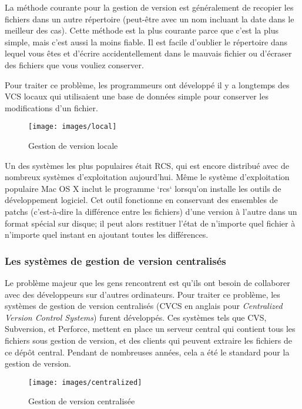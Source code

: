 La méthode courante pour la gestion de version est généralement de recopier les fichiers dans un autre répertoire (peut-être avec un nom incluant la date dans le meilleur des cas).
Cette méthode est la plus courante parce que c'est la plus simple, mais c'est aussi la moins fiable.
Il est facile d'oublier le répertoire dans lequel vous êtes et d'écrire accidentellement dans le mauvais fichier ou d'écraser des fichiers que vous vouliez conserver.

Pour traiter ce problème, les programmeurs ont développé il y a longtemps des VCS locaux qui utilisaient une base de données simple pour conserver les modifications d'un fichier.

\begin{figure}[H]
  \centering
  \texttt{[image: images/local]}
  \caption{Gestion de version locale}
  \label{fig:git:local}
\end{figure}

Un des systèmes les plus populaires était RCS, qui est encore distribué avec de nombreux systèmes d'exploitation aujourd'hui.
Même le système d'exploitation populaire Mac OS X inclut le programme `rcs` lorsqu'on installe les outils de développement logiciel.
Cet outil fonctionne en conservant des ensembles de patchs (c'est-à-dire la différence entre les fichiers) d'une version à l'autre dans un format spécial sur disque;
il peut alors restituer l'état de n'importe quel fichier à n'importe quel instant en ajoutant toutes les différences.

\subsubsection{Les systèmes de gestion de version centralisés}


Le problème majeur que les gens rencontrent est qu'ils ont besoin de collaborer avec des développeurs sur d'autres ordinateurs.
Pour traiter ce problème, les systèmes de gestion de version centralisés (CVCS en anglais pour \emph{Centralized Version Control Systems}) furent développés.
Ces systèmes tels que CVS, Subversion, et Perforce, mettent en place un serveur central qui contient tous les fichiers sous gestion de version, et des clients qui peuvent extraire les fichiers de ce dépôt central.
Pendant de nombreuses années, cela a été le standard pour la gestion de version.

\begin{figure}[H]
  \centering
  \texttt{[image: images/centralized]}
  \caption{Gestion de version centralisée}
  \label{fig:git:centralized}
\end{figure}

